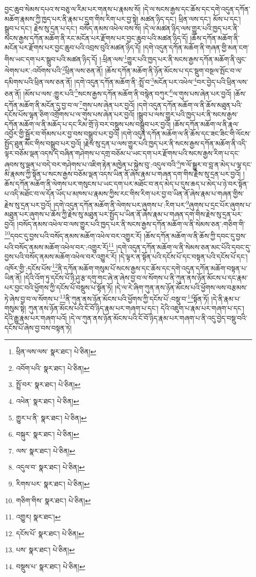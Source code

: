 བྱང་ཆུབ་སེམས་དཔའ་ས་བཅུ་ལ་རིམ་པར་གནས་པ་རྣམས་སོ། །དེ་ལ་སངས་རྒྱས་དང་ཆོས་དང་དགེ་འདུན་དཀོན་མཆོག་རྣམས་ཀྱི་ཁྱད་པར་ནི་རྣམ་པ་དྲུག་གིས་རིག་པར་བྱ་སྟེ། མཚན་ཉིད་དང་། ཕྲིན་ལས་དང་། མོས་པ་དང་། སྒྲུབ་པ་དང་། རྗེས་སུ་དྲན་པ་དང་། བསོད་ནམས་འཕེལ་བས་སོ། །དེ་ལ་མཚན་ཉིད་ལས་གྱུར་པའི་ཁྱད་པར་ནི་སངས་རྒྱས་དཀོན་མཆོག་ནི་རང་མངོན་པར་རྫོགས་པར་བྱང་ཆུབ་པའི་མཚན་ཉིད་དོ། །ཆོས་དཀོན་མཆོག་ནི་མངོན་པར་རྫོགས་པར་བྱང་ཆུབ་པའི་འབྲས་བུའི་མཚན་ཉིད་དོ། །དགེ་འདུན་དཀོན་མཆོག་ནི་གཞན་གྱི་མན་ངག་གིས་ཡང་དག་པར་སྒྲུབ་པའི་མཚན་ཉིད་དོ། །:ཕྲིན་ལས་\footnote{ཕྲིན་ལས་ལས་  སྣར་ཐང་།  པེ་ཅིན། }གྱུར་པའི་ཁྱད་པར་ནི་སངས་རྒྱས་དཀོན་མཆོག་ནི་ལུང་ལེགས་པར་:འབོགས་པའི་\footnote{འབོག་པའི་  སྣར་ཐང་།  པེ་ཅིན། }ཕྲིན་ལས་ཅན་ནོ། །ཆོས་དཀོན་མཆོག་ནི་ཉོན་མོངས་པ་དང་སྡུག་བསྔལ་སྤོང་བ་ལ་དམིགས་པའི་ཕྲིན་ལས་ཅན་ནོ། །དགེ་འདུན་དཀོན་མཆོག་ནི་:སྤྲོ་བ་\footnote{སྤྲོ་བར་  སྣར་ཐང་།  པེ་ཅིན། }མངོན་པར་འཕེལ་\footnote{འཕེན་  སྣར་ཐང་།  པེ་ཅིན། }བར་བྱེད་པའི་ཕྲིན་ལས་ཅན་ནོ། །མོས་པ་ལས་:གྱུར་པའི་\footnote{གྱུར་པ་ནི་  སྣར་ཐང་།  པེ་ཅིན། }སངས་རྒྱས་དཀོན་མཆོག་ནི་བསྙེན་བཀུར་\footnote{བསྐུར་  སྣར་ཐང་།  པེ་ཅིན། }ལ་གུས་པས་ཞེན་པར་བྱའོ། །ཆོས་དཀོན་མཆོག་ནི་མངོན་དུ་བྱ་བ་ལ་\footnote{ལས་  སྣར་ཐང་།  པེ་ཅིན། }གུས་པས་ཞེན་པར་བྱའོ། །དགེ་འདུན་དཀོན་མཆོག་ལ་ནི་ཆོས་མཐུན་པའི་དངོས་པོས་ལྷན་ཅིག་འགྲོགས་པ་ལ་གུས་པས་ཞེན་པར་བྱའོ། །སྒྲུབ་པ་ལས་གྱུར་པའི་ཁྱད་པར་ནི་སངས་རྒྱས་དཀོན་མཆོག་ལ་ནི་མཆོད་པ་དང་རིམ་གྲོ་ཉེ་བར་བསྡུས་པས་བསྒྲུབ་པར་བྱའོ། །ཆོས་དཀོན་མཆོག་ལ་ནི་རྣལ་འབྱོར་གྱི་སྦྱོར་བ་གོམས་པར་བྱ་བས་བསྒྲུབ་པར་བྱའོ། །དགེ་འདུན་དཀོན་མཆོག་ལ་ནི་ཆོས་དང་ཟང་ཟིང་གི་ལོངས་སྤྱོད་ཐུན་མོང་གིས་བསྒྲུབ་པར་བྱའོ། །རྗེས་སུ་དྲན་པ་ལས་གྱུར་པའི་ཁྱད་པར་ནི་སངས་རྒྱས་དཀོན་མཆོག་ནི་འདི་ལྟར་བཅོམ་ལྡན་འདས་དེ་བཞིན་གཤེགས་པ་དགྲ་བཅོམ་པ་ཡང་དག་པར་རྫོགས་པའི་སངས་རྒྱས་རིག་པ་དང་ཞབས་སུ་ལྡན་པ་བདེ་བར་གཤེགས་པ་འཇིག་རྟེན་མཁྱེན་པ་སྐྱེས་བུ་:འདུལ་བའི་\footnote{འདུལ་བ་  སྣར་ཐང་།  པེ་ཅིན། }ཁ་ལོ་སྒྱུར་བ་བླ་ན་མེད་པ་ལྷ་དང་མི་རྣམས་ཀྱི་སྟོན་པ་སངས་རྒྱས་བཅོམ་ལྡན་འདས་ཡིན་ནོ་ཞེས་རྣམ་པ་གཞན་དག་གིས་རྗེས་སུ་དྲན་པར་བྱའོ། །ཆོས་དཀོན་མཆོག་ནི་ལེགས་པར་གསུངས་པ་ཡང་དག་པར་མཐོང་བ་ནད་མེད་པ་དུས་ཆད་པ་མེད་པ་ཉེ་བར་སྟོན་པ་འདི་མཐོང་བ་ལ་དོན་ཡོད་པ་མཁས་པ་རྣམས་ཀྱིས་རང་གིས་རིག་པར་བྱ་བ་ཡིན་ནོ་ཞེས་རྣམ་པ་གཞན་གྱིས་རྗེས་སུ་དྲན་པར་བྱའོ། །དགེ་འདུན་དཀོན་མཆོག་ནི་ལེགས་པར་ཞུགས་པ་:རིག་པར་\footnote{རིགས་པར་  སྣར་ཐང་།  པེ་ཅིན། }ཞུགས་པ་དྲང་པོར་ཞུགས་པ་མཐུན་པར་ཞུགས་པ་ཆོས་ཀྱི་རྗེས་སུ་མཐུན་པར་སྤྱོད་པ་ཡིན་ནོ་ཞེས་རྣམ་པ་གཞན་དག་གིས་རྗེས་སུ་དྲན་པར་བྱའོ། །བསོད་ནམས་འཕེལ་བ་ལས་གྱུར་པའི་ཁྱད་པར་ནི་སངས་རྒྱས་དཀོན་མཆོག་ལ་ནི་སེམས་ཅན་:གཅིག་གི་\footnote{གཅིག་གིས་  སྣར་ཐང་།  པེ་ཅིན། }དབང་དུ་བྱས་པའི་བསོད་ནམས་མཆོག་འཕེལ་བར་འགྱུར་རོ། །ཆོས་དཀོན་མཆོག་ལ་ནི་ཆོས་ཀྱི་དབང་དུ་བྱས་པའི་བསོད་ནམས་མཆོག་འཕེལ་བར་:འགྱུར་རོ།\footnote{འགྱུར།  སྣར་ཐང་། } །དགེ་འདུན་དཀོན་མཆོག་ལ་ནི་སེམས་ཅན་མང་པོའི་དབང་དུ་བྱས་པའི་བསོད་ནམས་མཆོག་འཕེལ་བར་འགྱུར་རོ། །དེ་ལྟར་ན་སྟོན་པའི་དངོས་པོ་དང་བསྟན་པའི་དངོས་པོ་དང་། འཁོར་གྱི་:དངོས་པོས་\footnote{དངོས་པོ་  སྣར་ཐང་།  པེ་ཅིན། }ནི་དཀོན་མཆོག་གསུམ་པོ་སངས་རྒྱས་དང་ཆོས་དང་དགེ་འདུན་དཀོན་མཆོག་བསྟན་པ་ཡིན་ནོ། །དེའི་འོག་ཏུ་དངོས་པོ་ཉི་ཤུ་རྩ་དགུ་གང་ཞེ་ན་ཞེས་བྱ་བ་ལ་སོགས་པ་ནི་ཀུན་ནས་ཉོན་མོངས་པ་དང་རྣམ་པར་བྱང་བའི་ཕྱོགས་ཀྱི་དངོས་པོ་བསྡུས་པ་སྟོན་ཏོ། །དེ་ལ་རེ་ཞིག་ཀུན་ནས་ཉོན་མོངས་པའི་ཕྱོགས་ལས་བརྩམས་ཏེ་ཞེས་བྱ་བ་ལ་སོགས་པ་\footnote{པས་  སྣར་ཐང་།  པེ་ཅིན། }ནི་ཀུན་ནས་ཉོན་མོངས་པའི་ཕྱོགས་ཀྱི་དངོས་པོ་:བསྡུ་བ་\footnote{བསྡུས་པ་  སྣར་ཐང་།  པེ་ཅིན། }སྟོན་ཏོ། །དེ་ནི་རྣམ་པ་གསུམ་སྟེ། ཀུན་ནས་ཉོན་མོངས་པའི་ངོ་བོ་ཉིད་རྣམ་པར་གཞག་པ་དང་། དེའི་འཇུག་པ་རྣམ་པར་གཞག་པ་དང་། དེའི་རྒྱུ་རྣམ་པར་གཞག་པའོ། །དེ་ལ་ཀུན་ནས་ཉོན་མོངས་པའི་ངོ་བོ་ཉིད་རྣམ་པར་གཞག་པ་ནི་འདུ་བྱེད་བསྡུ་བའི་དངོས་པོ་ཞེས་བྱ་བས་བསྟན་ཏེ། 
